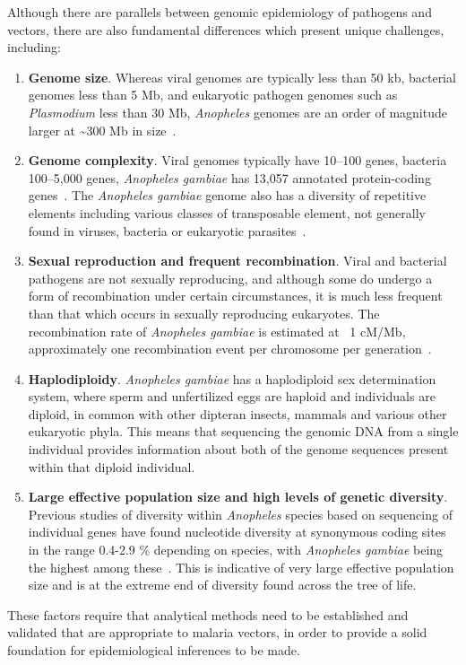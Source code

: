 \begin{refsection}
Although there are parallels between genomic epidemiology of pathogens and vectors, there are also fundamental differences which present unique challenges, including:
%
\begin{enumerate}
%
\item \textbf{Genome size}.
%
Whereas viral genomes are typically less than 50 kb, bacterial genomes less than 5 Mb, and eukaryotic pathogen genomes such as \textit{Plasmodium} less than 30 Mb, \textit{Anopheles} genomes are an order of magnitude larger at \textasciitilde 300 Mb in size~\parencite{Neafsey2015}.
%
\item \textbf{Genome complexity}.
%
Viral genomes typically have 10--100 genes, bacteria 100--5,000 genes, \textit{Anopheles gambiae} has 13,057 annotated protein-coding genes~\parencite{AgamP4.12,GiraldoCalderon2015}.
%
The \textit{Anopheles gambiae} genome also has a diversity of repetitive elements including various classes of transposable element, not generally found in viruses, bacteria or eukaryotic parasites~\parencite{Tu2004,FernandezMedina2011}.
%
\item \textbf{Sexual reproduction and frequent recombination}.
%
Viral and bacterial pathogens are not sexually reproducing, and although some do undergo a form of recombination under certain circumstances, it is much less frequent than that which occurs in sexually reproducing eukaryotes.
%
The recombination rate of \textit{Anopheles gambiae} is estimated at ~1 cM/Mb, approximately one recombination event per chromosome per generation~\parencite{Pombi2006}.
%
\item \textbf{Haplodiploidy}. 
%
\textit{Anopheles gambiae} has a haplodiploid sex determination system, where sperm and unfertilized eggs are haploid and individuals are diploid, in common with other dipteran insects, mammals and various other eukaryotic phyla.
%
This means that sequencing the genomic DNA from a single individual provides information about both of the genome sequences present within that diploid individual.
%
\item \textbf{Large effective population size and high levels of genetic diversity}.
%
Previous studies of diversity within \textit{Anopheles} species based on sequencing of individual genes have found nucleotide diversity at synonymous coding sites in the range 0.4-2.9 \% depending on species, with \textit{Anopheles gambiae} being the highest among these~\parencite{Leffler2012}.
%
This is indicative of very large effective population size and is at the extreme end of diversity found across the tree of life.
%
\end{enumerate}
%
These factors require that analytical methods need to be established and validated that are appropriate to malaria vectors, in order to provide a solid foundation for epidemiological inferences to be made.



\end{refsection}
